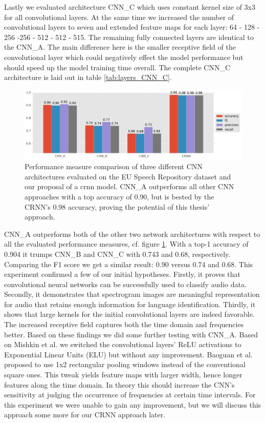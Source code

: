 Lastly we evaluated architecture CNN\_C which uses constant kernel size of 3x3 for all convolutional layers. At the same time we increased the number of convolutional layers to seven and extended feature maps for each layer: 64 - 128 - 256 -256 - 512 - 512 - 515. The remaining fully connected layers are identical to the CNN\_A. The main difference here is the smaller receptive field of the convolutional layer which could negatively effect the model performance but should speed up the model training time overall. The complete CNN\_C architecture is laid out in table \ref{tab:layers_CNN_C}.

	\begin{figure}[]
  		\centering
    	\includegraphics[width=\textwidth, keepaspectratio]{plots/results_eu_plot.pdf}
    	\caption{Performance measure comparison of three different CNN architectures evaluated on the EU Speech Repository dataset and our proposal of a \ac{crnn} model. CNN\_A outperforms all other CNN approaches with a top accuracy of 0.90, but is bested by the CRNN's 0.98 accuracy, proving the potential of this thesis' approach.}
    	\label{fig:eu_results}
	\end{figure}

CNN\_A outperforms both of the other two network architectures with respect to all the evaluated performance measures, cf. figure \ref{fig:eu_results}. With a top-1 accuracy of 0.904 it trumps CNN\_B and CNN\_C with 0.743 and 0.68, respectively. Comparing the F1 score we get a similar result: 0.90 versus 0.74 and 0.68. This experiment confirmed a few of our initial hypotheses. Firstly, it proves that convolutional neural networks can be successfully used to classify audio data. Secondly, it demonstrates that spectrogram images are meaningful representation for audio that retains enough information for language identification. Thirdly, it shows that large kernels for the initial convolutional layers are indeed favorable. The increased receptive field captures both the time domain and frequencies better. 
Based on these findings we did some further testing with CNN\_A. Based on Mishkin et al.\cite{mishkin2016systematic} we switched the convolutional layers' ReLU activations to Exponential Linear Units\cite{clevert2015fast} (ELU) but without any improvement. Baoguan et al. \cite{shi2016end} proposed to use 1x2 rectangular pooling windows instead of the conventional square ones. This tweak yields feature maps with larger width, hence longer features along the time domain. In theory this should increase the CNN's sensitivity at judging the occurrence of frequencies at certain time intervals. For this experiment we were unable to gain any improvement, but we will discuss this approach some more for our CRNN approach later.

